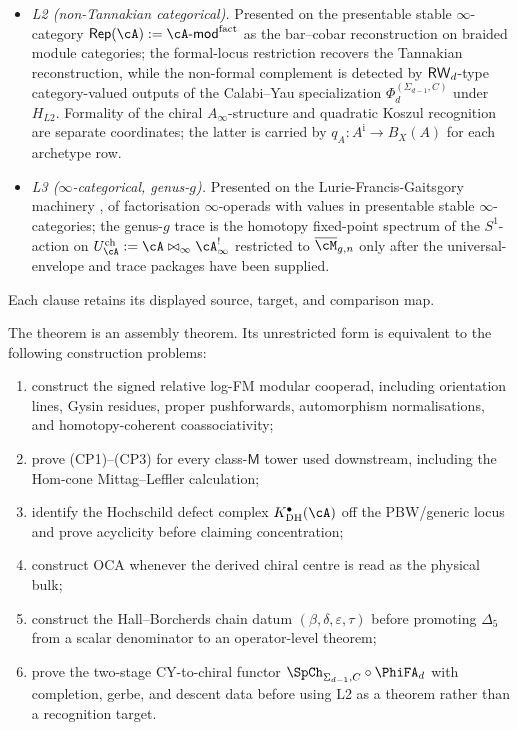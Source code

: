 \begin{theorem}
\begin{enumerate}[label=\textup{(\roman*)}]
\begin{itemize}
\item \emph{L2 (non-Tannakian categorical).} Presented on the
 presentable stable $\infty$-category
 $\Vrep(\cA) := \cA\text{-}\mathsf{mod}^{\mathrm{fact}}$ as the
 bar--cobar reconstruction on braided module categories; the
 formal-locus restriction recovers the Tannakian reconstruction,
 while the non-formal complement is detected by $\mathsf{RW}_d$-type
 category-valued outputs of the Calabi--Yau specialization
 $\Phi_d^{(\Sigma_{d-1},C)}$ under $H_{L2}$.  Formality of the
 chiral $A_\infty$-structure and quadratic Koszul recognition are
 separate coordinates; the latter is carried by
 $q_A\colon A^{\mathrm i}\to B_X(A)$ for each archetype row.
\item \emph{L3 ($\infty$-categorical, genus-$g$).} Presented on the
 Lurie-Francis-Gaitsgory machinery \cite[HA~5.2]{LurieDAGX}, \cite{FG12}
 of factorisation $\infty$-operads with values in presentable
 stable $\infty$-categories; the genus-$g$ trace is the homotopy
 fixed-point spectrum of the $S^1$-action on $\Uch_\cA :=
 \cA \bowtie_{\infty} \cA^!_\infty$ restricted to
 $\overline{\cM}_{g,n}$ only after the universal-envelope and trace
 packages have been supplied.
\end{itemize}
Each clause retains its displayed source, target, and comparison map.
\end{enumerate}
\end{theorem}

\begin{remark}
\label{rem:gu-missing-packages}
\ClaimStatusConditional
The theorem is an assembly theorem.  Its unrestricted form is
equivalent to the following construction problems:
\begin{enumerate}[label=\textup{(\arabic*)}]
\item construct the signed relative log-FM modular cooperad, including
orientation lines, Gysin residues, proper pushforwards, automorphism
normalisations, and homotopy-coherent coassociativity;
\item prove \textup{(CP1)--(CP3)} for every class-$\mathsf M$ tower
used downstream, including the Hom-cone Mittag--Leffler calculation;
\item identify the Hochschild defect complex
$K^\bullet_{\mathrm{DH}}(\cA)$ off the PBW/generic locus and prove
acyclicity before claiming concentration;
\item construct OCA whenever the derived chiral centre is read as the
physical bulk;
\item construct the Hall--Borcherds chain datum
$(\beta,\delta,\varepsilon,\tau)$ before promoting $\Delta_5$ from a
scalar denominator to an operator-level theorem;
\item prove the two-stage CY-to-chiral functor
$\SpCh_{\Sigma_{d-1},C}\circ\PhiFA_d$ with completion, gerbe, and
descent data before using L2 as a theorem rather than a recognition
target.
\end{enumerate}
\end{remark}

